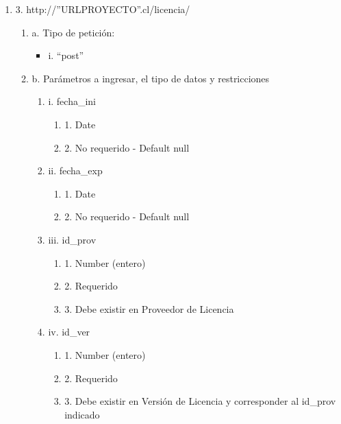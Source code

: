 \begin{enumerate}
    \item 3. http://”URLPROYECTO”.cl/licencia/
    \begin{enumerate}
        \item a. Tipo de petición:
            \begin{itemize}
               \item i. “post”
            \end{itemize}
        \item b. Parámetros a ingresar, el tipo de datos y restricciones
            \begin{enumerate}
                \item i. fecha\_ini
                    \begin{enumerate}
                        \item 1. Date
                        \item 2. No requerido - Default null
                    \end{enumerate}
                \item ii. fecha\_exp
                    \begin{enumerate}
                        \item 1. Date
                        \item 2. No requerido - Default null
                    \end{enumerate}
                \item iii. id\_prov
                    \begin{enumerate}
                        \item 1. Number (entero)
                        \item 2. Requerido
                        \item 3. Debe existir en Proveedor de Licencia
                    \end{enumerate}
                \item iv. id\_ver
                    \begin{enumerate}
                        \item 1. Number (entero)
                        \item 2. Requerido
                        \item 3. Debe existir en Versión de Licencia y corresponder al id\_prov indicado
                    \end{enumerate}
            \end{enumerate}
    \end{enumerate}


\end{enumerate}
